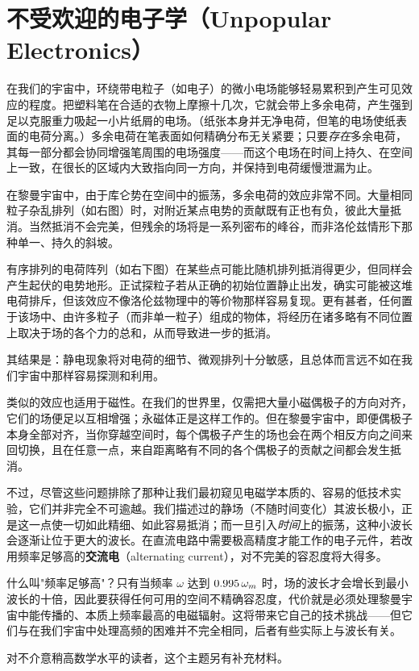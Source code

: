 \section{不受欢迎的电子学（Unpopular Electronics）}

在我们的宇宙中，环绕带电粒子（如电子）的微小电场能够轻易累积到产生可见效应的程度。把塑料笔在合适的衣物上摩擦十几次，它就会带上多余电荷，产生强到足以克服重力吸起一小片纸屑的电场。（纸张本身并无净电荷，但笔的电场使纸表面的电荷分离。）多余电荷在笔表面如何精确分布无关紧要；只要\emph{存在}多余电荷，其每一部分都会协同增强笔周围的电场强度——而这个电场在时间上持久、在空间上一致，在很长的区域内大致指向同一方向，并保持到电荷缓慢泄漏为止。


在黎曼宇宙中，由于库仑势在空间中的振荡，多余电荷的效应非常不同。大量相同粒子杂乱排列（如右图）时，对附近某点电势的贡献既有正也有负，彼此大量抵消。当然抵消不会完美，但残余的场将是一系列密布的峰谷，而非洛伦兹情形下那种单一、持久的斜坡。

有序排列的电荷阵列（如右下图）在某些点可能比随机排列抵消得更少，但同样会产生起伏的电势地形。正试探粒子若从正确的初始位置静止出发，确实可能被这堆电荷排斥，但该效应不像洛伦兹物理中的等价物那样容易复现。更有甚者，任何置于该场中、由许多粒子（而非单一粒子）组成的物体，将经历在诸多略有不同位置上取决于场的各个力的总和，从而导致进一步的抵消。

其结果是：静电现象将对电荷的细节、微观排列十分敏感，且总体而言远不如在我们宇宙中那样容易探测和利用。

类似的效应也适用于磁性。在我们的世界里，仅需把大量小磁偶极子的方向对齐，它们的场便足以互相增强；永磁体正是这样工作的。但在黎曼宇宙中，即便偶极子本身全部对齐，当你穿越空间时，每个偶极子产生的场也会在两个相反方向之间来回切换，且在任意一点，来自距离略有不同的各个偶极子的贡献之间都会发生抵消。

不过，尽管这些问题排除了那种让我们最初窥见电磁学本质的、容易的低技术实验，它们并非完全不可逾越。我们描述过的静场（不随时间变化）其波长极小，正是这一点使一切如此精细、如此容易抵消；而一旦引入\emph{时间}上的振荡，这种小波长会逐渐让位于更大的波长。在直流电路中需要极高精度才能工作的电子元件，若改用频率足够高的\textbf{交流电}（alternating current），对不完美的容忍度将大得多。

什么叫"频率足够高"？只有当频率 $\omega$ 达到 $0.995\,\omega_m$ 时，场的波长才会增长到最小波长的十倍，因此要获得任何可用的空间不精确容忍度，代价就是必须处理黎曼宇宙中能传播的、本质上频率最高的电磁辐射。这将带来它自己的技术挑战——但它们与在我们宇宙中处理高频的困难并不完全相同，后者有些实际上与波长有关。

对不介意稍高数学水平的读者，这个主题另有补充材料。
